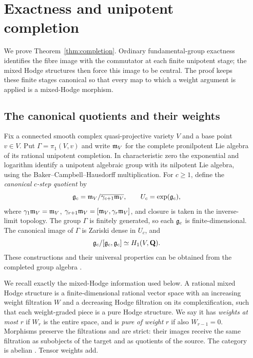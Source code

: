\section{Exactness and unipotent completion}\label{sec:mhs}

We prove Theorem~\ref{thm:completion}. Ordinary fundamental-group
exactness identifies the fibre image with the commutator at each finite
unipotent stage; the mixed Hodge structures then force this image to be
central.
The proof keeps these finite stages canonical so that every map to
which a weight argument is applied is a mixed-Hodge morphism.

\subsection{The canonical quotients and their weights}
Fix a connected smooth complex quasi-projective variety $V$ and a base
point $v\in V$. Put $\Gamma=\pi_1(V,v)$ and write $\mathfrak m_V$ for the
complete pronilpotent Lie algebra of its rational unipotent completion.
In characteristic zero the exponential and logarithm identify a
unipotent algebraic group with its nilpotent Lie algebra, using the
Baker--Campbell--Hausdorff multiplication. For $c\geq1$, define the
\emph{canonical $c$-step quotient} by
\begin{equation}\label{eq:canonical-quotient}
 \mathfrak g_c=\mathfrak m_V/\overline{\gamma_{c+1}\mathfrak m_V},
 \qquad U_c=\exp(\mathfrak g_c),
\end{equation}
where $\gamma_1\mathfrak m_V=\mathfrak m_V$,
$\gamma_{r+1}\mathfrak m_V=[\mathfrak m_V,\gamma_r\mathfrak m_V]$, and closure is taken in the
inverse-limit topology. The group $\Gamma$ is finitely generated, so
each $\mathfrak g_c$ is finite-dimensional. The canonical image of $\Gamma$ is
Zariski dense in $U_c$, and
\begin{equation}\label{eq:hurewicz}
 \mathfrak g_c/[\mathfrak g_c,\mathfrak g_c]\simeq H_1(V,\mathbf Q).
\end{equation}
These constructions and their universal properties can be obtained from
the completed group algebra
\cite[\S2.5, Theorem 2.5.3 and Proposition 2.5.5]{Hain1987}.

We recall exactly the mixed-Hodge information used below. A rational
mixed Hodge structure is a finite-dimensional rational vector space
with an increasing weight filtration $W$ and a decreasing Hodge
filtration on its complexification, such that each weight-graded piece
is a pure Hodge structure. We say it has \emph{weights at most $r$} if
$W_r$ is the entire space, and is \emph{pure of weight $r$} if also
$W_{r-1}=0$. Morphisms preserve the filtrations and are strict: their
images receive the same filtration as subobjects of the target and as
quotients of the source. The category is abelian
\cite[Theorem 2.3.5 and \S2.3.8]{Deligne1971}. Tensor weights add.

